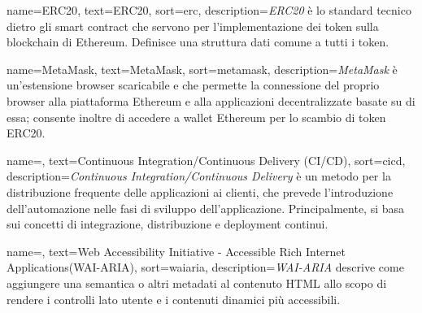 {
    name={ERC20},
    text=ERC20,
    sort=erc,
    description={\emph{ERC20} è lo standard tecnico dietro gli smart contract che servono per l'implementazione dei token sulla blockchain di Ethereum. Definisce una struttura dati comune a tutti i token.}
}

{
    name={MetaMask},
    text=MetaMask,
    sort=metamask,
    description={\emph{MetaMask} è un'estensione browser scaricabile e che permette la connessione del proprio browser alla piattaforma Ethereum e alla applicazioni decentralizzate basate su di essa; consente inoltre di accedere a wallet Ethereum per lo scambio di token ERC20.}
}

{
    name=,
    text=Continuous Integration/Continuous Delivery (CI/CD),
    sort=cicd,
    description={\emph{Continuous Integration/Continuous Delivery} è un metodo per la distribuzione frequente delle applicazioni ai clienti, che prevede l’introduzione dell’automazione nelle fasi di sviluppo dell’applicazione. Principalmente, si basa sui concetti di integrazione, distribuzione e deployment continui.}
}

{
    name=,
    text=Web Accessibility Initiative - Accessible Rich Internet Applications(WAI-ARIA),
    sort=waiaria,
    description={\emph{WAI-ARIA}  descrive come aggiungere una semantica o altri metadati al contenuto HTML allo scopo di rendere i controlli lato utente e i contenuti dinamici più accessibili.}
}